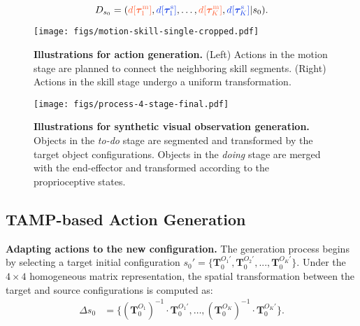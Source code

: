 \begin{equation*}
    D_{s_0} = (\textcolor{myorange}{d[{\bm{\tau}^{\mathrm{m}}_1}]}, \textcolor{myblue}{d[{\bm{\tau}^{\mathrm{s}}_1}]}, \dots, \textcolor{myorange}{d[{\bm{\tau}^{\mathrm{m}}_K}]}, \textcolor{myblue}{d[{\bm{\tau}^{\mathrm{s}}_K}]} | s_0).
\end{equation*}






\begin{figure}[b]
    \vspace{-0.2cm}
    \centering
    \texttt{[image: figs/motion-skill-single-cropped.pdf]}
    \caption{\textbf{Illustrations for action generation.} (Left) Actions in the \textcolor{myorange}{motion} stage are planned to connect the neighboring skill segments. (Right) Actions in the \textcolor{myblue}{skill} stage undergo a uniform transformation.}
    \label{fig:method-motion-skill}
\end{figure}



\begin{figure*}
    \centering
    \texttt{[image: figs/process-4-stage-final.pdf]}
    
    \caption{\textbf{Illustrations for synthetic visual observation generation.} Objects in the \textit{to-do} stage are segmented and transformed by the target object configurations. Objects in the \textit{doing} stage are merged with the end-effector and transformed according to the proprioceptive states.}
    \label{fig:method-traj}
    \vspace{-0.2cm}
\end{figure*}





\subsection{TAMP-based Action Generation}

\noindent\textbf{Adapting actions to the new configuration.} The generation process begins by selecting a target initial configuration $s_0'=\{\mathbf{T}_0^{{O_1}'}, \mathbf{T}_0^{{O_2}'}, ..., \mathbf{T}_0^{{O_K}'}\}$. Under the $4\times 4$ homogeneous matrix representation, the spatial transformation between the target and source configurations is computed as: 
\begin{align*}
    \Delta s_0
    &=\{(\mathbf{T}_0^{{O_1}})^{-1} \cdot \mathbf{T}_0^{{O_1}'}, \dots, (\mathbf{T}_0^{{O_K}})^{-1} \cdot \mathbf{T}_0^{{O_K}'}\}.
\end{align*}

